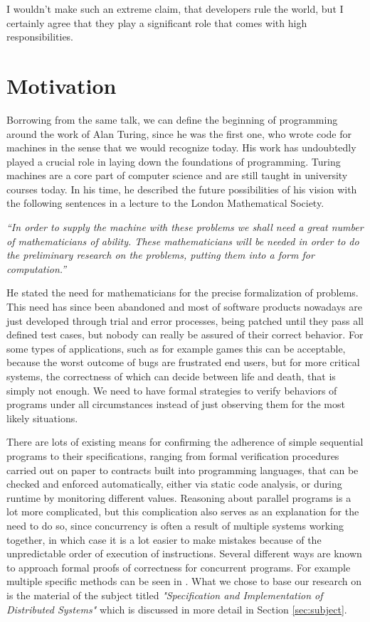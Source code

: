 I wouldn't make such an extreme claim, that developers rule the world, but I certainly agree that they play a significant role that comes with high responsibilities.

\section{Motivation}

Borrowing from the same talk, we can define the beginning of programming around the work of Alan Turing, since he was the first one, who wrote code for machines in the sense that we would recognize today. His work has undoubtedly played a crucial role in laying down the foundations of programming. Turing machines are a core part of computer science and are still taught in university courses today. In his time, he described the future possibilities of his vision with the following sentences in a lecture to the London Mathematical Society\cite{turing-lecture}.

\textit{``In order to supply the machine with these problems we shall need a great number of mathematicians of ability. These mathematicians will be needed in order to do the preliminary research on the problems, putting them into a form for computation.''}

He stated the need for mathematicians for the precise formalization of problems. This need has since been abandoned and most of software products nowadays are just developed through trial and error processes, being patched until they pass all defined test cases, but nobody can really be assured of their correct behavior. For some types of applications, such as for example games this can be acceptable, because the worst outcome of bugs are frustrated end users, but for more critical systems, the correctness of which can decide between life and death, that is simply not enough. We need to have formal strategies to verify behaviors of programs under all circumstances instead of just observing them for the most likely situations.

There are lots of existing means for confirming the adherence of simple sequential programs to their specifications, ranging from formal verification procedures carried out on paper to contracts built into programming languages, that can be checked and enforced automatically, either via static code analysis, or during runtime by monitoring different values. Reasoning about parallel programs is a lot more complicated, but this complication also serves as an explanation for the need to do so, since concurrency is often a result of multiple systems working together, in which case it is a lot easier to make mistakes because of the unpredictable order of execution of instructions. Several different ways are known to approach formal proofs of correctness for concurrent programs. For example multiple specific methods can be seen in \cite{hons_1202}. What we chose to base our research on is the material of the subject titled \textit{"Specification and Implementation of Distributed Systems"} which is discussed in more detail in Section \ref{sec:subject}.

